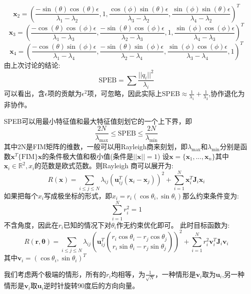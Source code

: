 \documentclass[12pt]{article}
\theoremstyle{remark}
\begin{document}
\[
\bm{x}_2=(\frac{-\sin(\theta)\cos(\theta)\epsilon}{\lambda_1-\lambda_2},1,\frac{\cos(\phi)\sin(\theta)\epsilon}{\lambda_3-\lambda_2},\frac{\sin(\phi)\sin(\theta)\epsilon}{\lambda_4-\lambda_2})^T
\]
\[
\bm{x}_3=(\frac{-\cos(\theta)\cos(\phi)\epsilon}{\lambda_1-\lambda_3},\frac{-\sin(\theta)\cos(\phi)\epsilon}{\lambda_2-\lambda_3},1,\frac{\sin(\phi)\cos(\phi)\epsilon}{\lambda_4-\lambda_3})^T
\]
\[
\bm{x}_4=(\frac{-\cos(\theta)\sin(\phi)\epsilon}{\lambda_1-\lambda_4},\frac{-\sin(\theta)\sin(\phi)\epsilon}{\lambda_2-\lambda_4},\frac{\sin(\phi)\cos(\phi)\epsilon}{\lambda_3-\lambda_4},1)^T
\]
由上次讨论的结论:
\begin{equation}
\text{SPEB}=\sum \frac{||q_i||^2}{\lambda_i}
\end{equation}
可以看出，含$\epsilon$项的贡献为$\epsilon^2$项，可忽略，因此实际上SPEB$\approx \frac{1}{\lambda_1}+\frac{1}{\lambda_2}$,协作退化为非协作。

SPEB可以用最小特征值和最大特征值刻划它的一个上下界，即
\begin{equation}
\frac{2N}{\lambda_{\text{max}}} \leq \text{SPEB} 
\leq \frac{2N}{\lambda_{\text{min}}}
\end{equation}
其中2N是FIM矩阵的维数，一般可以用Rayleigh商来刻划，即$\lambda_{\text{max}}$和$\lambda_{\text{min}}$分别是函数$\bm{x}^T\{\text{FIM}\}\bm{x}$的条件极大值和极小值(条件是$||\bm{x}||=1$)
设$\bm{x}=\{\bm{x}_1,...,\bm{x}_n\}$其中$\bm{x}_i \in \mathbb{R}^2,x_i$的范数是欧式范数。则Rayleigh 商可以展开为:
\begin{equation}\label{eq:MaxMin}
R(\bm{x})=\sum_{i\leq j\leq N} \lambda_{ij}(\bm{u}_{ij}^T(\bm{x}_i-\bm{x}_j))^2+\sum_{i=1}^N \bm{x}_i^T\bm{J}_i\bm{x}_i
\end{equation}
如果把每个$x_i$写成极坐标的形式，即$x_i=r_i(\cos \theta_i,\sin \theta_i)$那么约束条件变为:
\begin{equation}
\sum_{i=1}^{N} r_i^2=1
\end{equation}
不含角度，因此在$r_i$已知的情况下对$\theta_i$作无约束优化即可。
此时目标函数为:
\begin{equation}
R(\bm{r},\bm{\theta})=\sum_{i\leq j\leq N} \lambda_{ij}(\bm{u}_{ij}^T\binom{r_i \cos \theta_i-r_j \cos \theta_j}{r_i \sin \theta_i-r_j \sin \theta_j})^2+\sum_{i=1}^N r_i^2\bm{v}_i^T\bm{J}_i\bm{v}_i
\end{equation}
其中$\bm{v}_i=(\cos \theta_i,\sin \theta_i)^T$

我们考虑两个极端的情形，所有的$r_i$均相等，为$\frac{1}{\sqrt{N}}$，一种情形是$\bm{v}_i$取为$\bm{u}_i$,另一种情形是$\bm{v}_i$取$\bm{u}_i$逆时针旋转90度后的方向向量。
\end{document}
